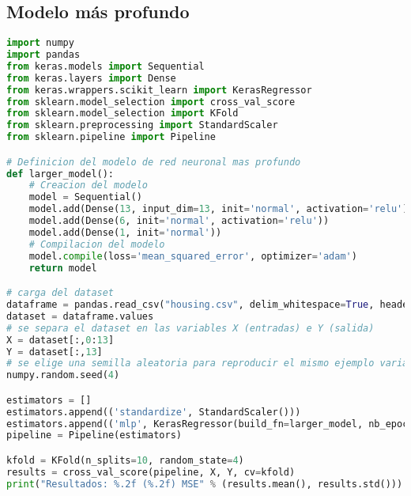 \subsection{Modelo más profundo}
\begin{lstlisting}[language=Python]
import numpy
import pandas
from keras.models import Sequential
from keras.layers import Dense
from keras.wrappers.scikit_learn import KerasRegressor
from sklearn.model_selection import cross_val_score
from sklearn.model_selection import KFold
from sklearn.preprocessing import StandardScaler
from sklearn.pipeline import Pipeline

# Definicion del modelo de red neuronal mas profundo
def larger_model():
	# Creacion del modelo
	model = Sequential()
	model.add(Dense(13, input_dim=13, init='normal', activation='relu'))
	model.add(Dense(6, init='normal', activation='relu'))
	model.add(Dense(1, init='normal'))
	# Compilacion del modelo
	model.compile(loss='mean_squared_error', optimizer='adam')
	return model

# carga del dataset
dataframe = pandas.read_csv("housing.csv", delim_whitespace=True, header=None)
dataset = dataframe.values
# se separa el dataset en las variables X (entradas) e Y (salida)
X = dataset[:,0:13]
Y = dataset[:,13]
# se elige una semilla aleatoria para reproducir el mismo ejemplo varias veces
numpy.random.seed(4)

estimators = []
estimators.append(('standardize', StandardScaler()))
estimators.append(('mlp', KerasRegressor(build_fn=larger_model, nb_epoch=50, batch_size=5, verbose=0)))
pipeline = Pipeline(estimators)

kfold = KFold(n_splits=10, random_state=4)
results = cross_val_score(pipeline, X, Y, cv=kfold)
print("Resultados: %.2f (%.2f) MSE" % (results.mean(), results.std()))
\end{lstlisting}

